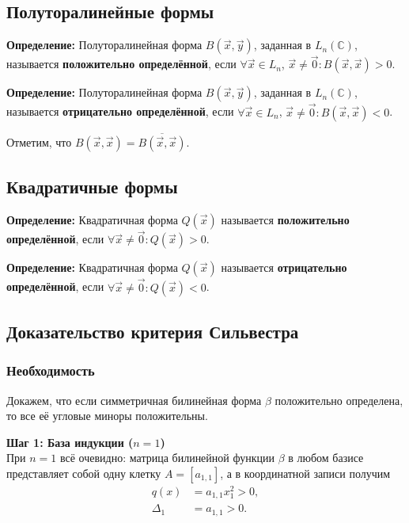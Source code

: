 \documentclass[12pt]{article}
\begin{document}
\subsection*{Полуторалинейные формы}

\textbf{Определение:} Полуторалинейная форма $B(\vec{x}, \vec{y})$, заданная в $L_n(\mathbb{C})$, называется \textbf{положительно определённой}, если $\forall \vec{x} \in L_n$, $\vec{x} \neq \vec{0}: B(\vec{x}, \vec{x}) > 0$.



\textbf{Определение:} Полуторалинейная форма $B(\vec{x}, \vec{y})$, заданная в $L_n(\mathbb{C})$, называется \textbf{отрицательно определённой}, если $\forall \vec{x} \in L_n$, $\vec{x} \neq \vec{0}: B(\vec{x}, \vec{x}) < 0$.



Отметим, что $B(\vec{x}, \vec{x}) = \overline{B(\vec{x}, \vec{x})}$.



\subsection*{Квадратичные формы}

\textbf{Определение:} Квадратичная форма $Q(\vec{x})$ называется \textbf{положительно определённой}, если $\forall \vec{x} \neq \vec{0}: Q(\vec{x}) > 0$.



\textbf{Определение:} Квадратичная форма $Q(\vec{x})$ называется \textbf{отрицательно определённой}, если $\forall \vec{x} \neq \vec{0}: Q(\vec{x}) < 0$.



\subsection*{Доказательство критерия Сильвестра}


\subsubsection*{Необходимость}
Докажем, что если симметричная билинейная форма $\beta$ положительно определена, то все её угловые миноры положительны.

\textbf{Шаг 1: База индукции ($n = 1$)} \\
При $n = 1$ всё очевидно: матрица билинейной функции $\beta$ в любом базисе представляет собой одну клетку $A = [a_{1,1}]$, а в координатной записи получим
\begin{align*}
q(x) &= a_{1,1} x_1^2 > 0, \\
\Delta_1 &= a_{1,1} > 0.
\end{align*}
\end{document}
